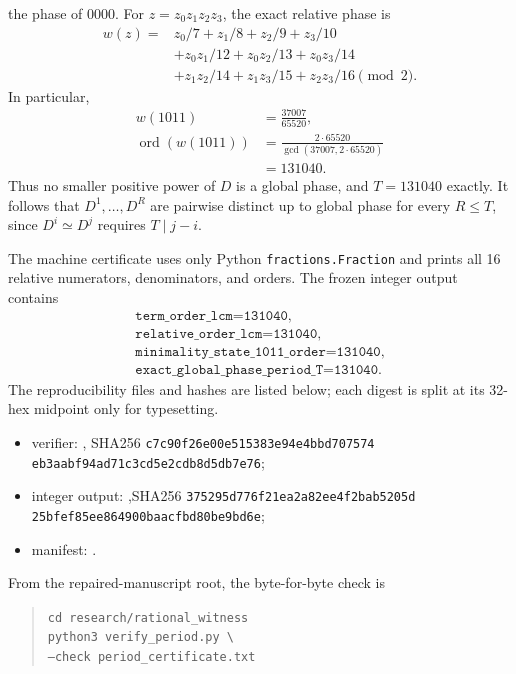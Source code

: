 the phase of $0000$.  For $z=z_0z_1z_2z_3$, the exact relative phase is
\begin{equation*}
\begin{aligned}
w(z)={}&z_0/7+z_1/8+z_2/9+z_3/10\\
 &+z_0z_1/12+z_0z_2/13+z_0z_3/14\\
 &+z_1z_2/14+z_1z_3/15+z_2z_3/16
 \pmod 2.
\end{aligned}
\end{equation*}
In particular,
\begin{equation*}
\begin{aligned}
 w(1011)&=\frac{37007}{65520},\\
 \operatorname{ord}(w(1011))
 &=\frac{2\cdot65520}{\gcd(37007,2\cdot65520)}\\
 &=131040.
\end{aligned}
\end{equation*}
Thus no smaller positive power of $D$ is a global phase, and
$T=131040$ exactly.  It follows that
$D^1,\ldots,D^R$ are pairwise distinct up to global phase for every
$R\leq T$, since $D^i\simeq D^j$ requires $T\mid j-i$.

The machine certificate uses only Python \texttt{fractions.Fraction} and
prints all 16 relative numerators, denominators, and orders.  The frozen
integer output contains
\begin{equation*}
\begin{gathered}
\texttt{term\_order\_lcm=131040},\\
\texttt{relative\_order\_lcm=131040},\\
\texttt{minimality\_state\_1011\_order=131040},\\
\texttt{exact\_global\_phase\_period\_T=131040}.
\end{gathered}
\end{equation*}
The reproducibility files and hashes are listed below; each digest is split
at its 32-hex midpoint only for typesetting.
\begin{itemize}[leftmargin=1.5em]
 \item verifier: ,\newline
 SHA256 \texttt{c7c90f26e00e515383e94e4bbd707574}\allowbreak
 \texttt{eb3aabf94ad71c3cd5e2cdb8d5db7e76};
 \item integer output:
 ,\newline SHA256
 \texttt{375295d776f21ea2a82ee4f2bab5205d}\allowbreak
 \texttt{25bfef85ee864900baacfbd80be9bd6e};
 \item manifest: .
\end{itemize}
From the repaired-manuscript root, the byte-for-byte check is
\begin{quote}
\footnotesize
\texttt{cd research/rational\_witness}\\
\texttt{python3 verify\_period.py \textbackslash}\\
\texttt{\quad --check period\_certificate.txt}
\end{quote}

